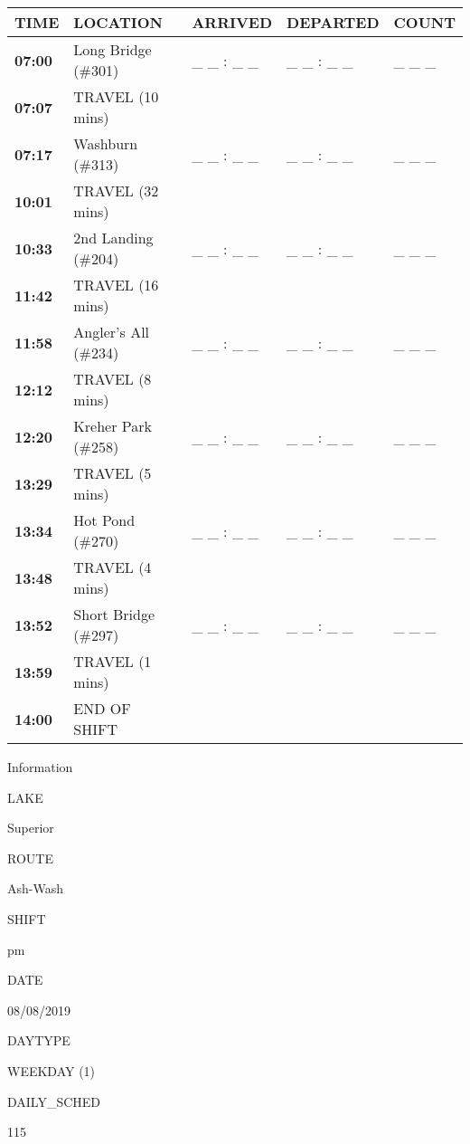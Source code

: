 \documentclass[]{article}
\begin{document}
\begin{tabular}{>{\bfseries}lllll}
\toprule
\textbf{TIME} & \textbf{LOCATION} & \textbf{ARRIVED} & \textbf{DEPARTED} & \textbf{COUNT}\\
\midrule
07:00 & Long Bridge (\#301) & \_ \_ : \_ \_ & \_ \_ : \_ \_ & \_ \_ \_\\
07:07 & TRAVEL (10 mins) &  &  & \\
07:17 & Washburn (\#313) & \_ \_ : \_ \_ & \_ \_ : \_ \_ & \_ \_ \_\\
10:01 & TRAVEL (32 mins) &  &  & \\
10:33 & 2nd Landing (\#204) & \_ \_ : \_ \_ & \_ \_ : \_ \_ & \_ \_ \_\\
11:42 & TRAVEL (16 mins) &  &  & \\
11:58 & Angler's All (\#234) & \_ \_ : \_ \_ & \_ \_ : \_ \_ & \_ \_ \_\\
12:12 & TRAVEL (8 mins) &  &  & \\
12:20 & Kreher Park (\#258) & \_ \_ : \_ \_ & \_ \_ : \_ \_ & \_ \_ \_\\
13:29 & TRAVEL (5 mins) &  &  & \\
13:34 & Hot Pond (\#270) & \_ \_ : \_ \_ & \_ \_ : \_ \_ & \_ \_ \_\\
13:48 & TRAVEL (4 mins) &  &  & \\
13:52 & Short Bridge (\#297) & \_ \_ : \_ \_ & \_ \_ : \_ \_ & \_ \_ \_\\
13:59 & TRAVEL (1 mins) &  &  & \\
14:00 & END OF SHIFT &  &  & \\
\bottomrule
\end{tabular}\newpage

Information

LAKE

Superior

ROUTE

Ash-Wash

SHIFT

pm

DATE

08/08/2019

DAYTYPE

WEEKDAY (1)

DAILY\_SCHED

115

\vspace{24pt}
\end{document}

